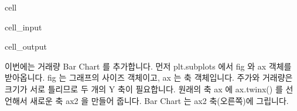 \documentclass[letterpaper,10pt,english]{jupyterBook}
\begin{document}
\begin{sphinxuseclass}{cell}\begin{sphinxVerbatimInput}

\begin{sphinxuseclass}{cell_input}
\begin{sphinxVerbatim}[commandchars=\\\{\}]
\PYG{p}{[}\PYG{p}{]} 
\end{sphinxVerbatim}

\end{sphinxuseclass}\end{sphinxVerbatimInput}
\begin{sphinxVerbatimOutput}

\begin{sphinxuseclass}{cell_output}
\noindent{}

\end{sphinxuseclass}\end{sphinxVerbatimOutput}

\end{sphinxuseclass}
\sphinxAtStartPar
 이번에는 거래량 Bar Chart 를 추가합니다. 먼저 plt.subplots 에서 fig 와 ax 객체를 받아옵니다. fig 는 그래프의 사이즈 객체이고, ax 는 축 객체입니다. 주가와 거래량은 크기가 서로 틀리므로 두 개의 Y 축이 필요합니다. 원래의 축 ax 에 ax.twinx() 를 선언해서 새로운 축 ax2 을 만들어 줍니다. Bar Chart 는 ax2 축(오른쪽)에 그립니다.
\end{document}

